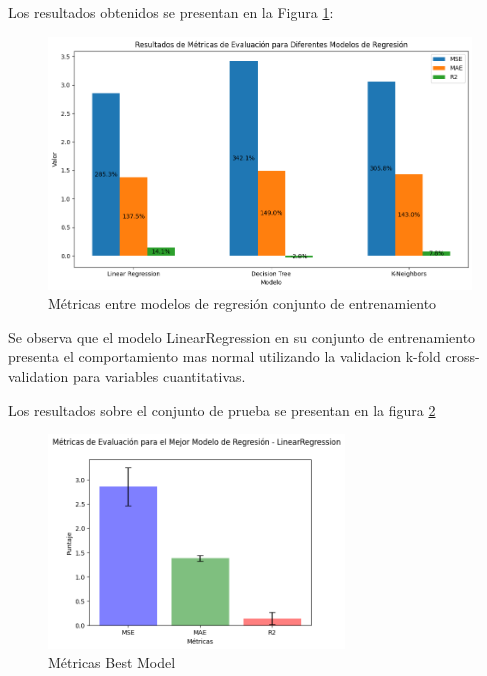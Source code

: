 Los resultados obtenidos se presentan en la Figura \ref{fig:metricas_regresion}:

\begin{figure}[H]
    \centering
    \includegraphics[width=1\textwidth]{img/compara_algoritmos/metricasEntreModelosRegresion.png}
    \caption{Métricas entre modelos de regresión conjunto de entrenamiento}
    \label{fig:metricas_regresion}
\end{figure}

Se observa que el modelo LinearRegression en su conjunto de entrenamiento presenta el comportamiento mas normal utilizando la validacion k-fold cross-validation para variables cuantitativas.

Los resultados sobre el conjunto de prueba se presentan en la figura \ref{fig:metricas_regresion_bestModel}

\begin{figure}[H]
    \centering
    \includegraphics[width=0.7\textwidth]{img/compara_algoritmos/metricasBestModelLinearRegression.png}
    \caption{Métricas Best Model}
    \label{fig:metricas_regresion_bestModel}
\end{figure}


